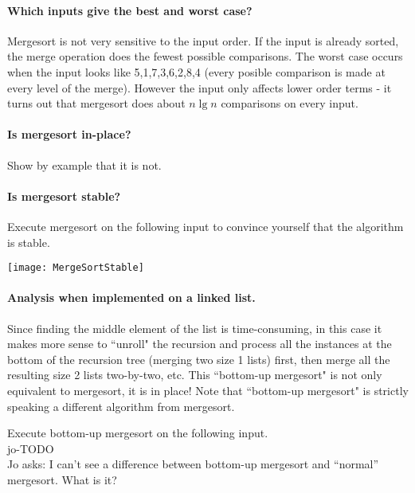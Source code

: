 \paragraph{Which inputs give the best and worst case?}
Mergesort is not very sensitive to the input order. 
If the input is already sorted, the merge operation does the fewest possible comparisons. The worst case occurs when the input looks like 5,1,7,3,6,2,8,4 (every posible comparison is made at every level of the merge). However the input only affects lower order terms - it turns out  that mergesort does about $n\lg n$ comparisons on every input.

\paragraph{Is mergesort in-place?}
\begin{Boxample}[4]
Show by example that it is not.
\end{Boxample}

\paragraph{Is mergesort stable?}

\begin{Boxample}[0]
Execute mergesort on the following input to convince yourself that the algorithm is stable.
\begin{center}
\texttt{[image: MergeSortStable]} 
\end{center} 
\end{Boxample}

\paragraph{Analysis when implemented on a linked list.}
Since finding the middle element of the list is time-consuming, in this case it makes more sense to ``unroll" the recursion and process all the instances at the bottom of the recursion tree (merging two size 1 lists) first, then merge all the resulting size 2 lists two-by-two, etc. This ``bottom-up mergesort" is not only equivalent to mergesort, it is in place! Note that ``bottom-up mergesort" is strictly speaking a different algorithm from mergesort.

\begin{Boxample}[6]
Execute  bottom-up mergesort  on the following input.\\
jo-TODO\\
Jo asks: I can't see a difference between bottom-up mergesort and ``normal'' mergesort. What is it?
\end{Boxample}


